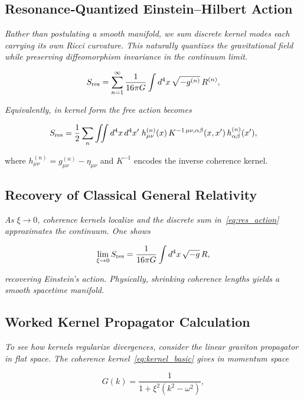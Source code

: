 \subsection{Resonance‐Quantized Einstein–Hilbert Action}

\textit{Rather than postulating a smooth manifold, we sum discrete kernel modes each carrying its own Ricci curvature.  This naturally quantizes the gravitational field while preserving diffeomorphism invariance in the continuum limit.}

\begin{equation}\label{eq:res_action}
S_{\rm res}
= \sum_{n=1}^\infty \frac{1}{16\pi G}
  \int d^4x\,\sqrt{-g^{(n)}}\,R^{(n)},
\end{equation}

\textit{Equivalently, in kernel form the free action becomes}

\begin{equation}\label{eq:kernel_eh}
S_{\rm res}
= \frac{1}{2}\sum_n \iint d^4x\,d^4x'\;
  h_{\mu\nu}^{(n)}(x)\,
  K^{-1\,\mu\nu,\alpha\beta}(x,x')\,
  h_{\alpha\beta}^{(n)}(x'),
\end{equation}

\noindent where $h_{\mu\nu}^{(n)}=g_{\mu\nu}^{(n)}-\eta_{\mu\nu}$ and $K^{-1}$ encodes the inverse coherence kernel.

\subsection{Recovery of Classical General Relativity}

\textit{As $\xi\to0$, coherence kernels localize and the discrete sum in~\eqref{eq:res_action} approximates the continuum.  One shows}

\[
\lim_{\xi\to0}S_{\rm res}
= \frac{1}{16\pi G}\int d^4x\,\sqrt{-g}\,R,
\]

\textit{recovering Einstein’s action.  Physically, shrinking coherence lengths yields a smooth spacetime manifold.}

\subsection{Worked Kernel Propagator Calculation}

\textit{To see how kernels regularize divergences, consider the linear graviton propagator in flat space.  The coherence kernel~\eqref{eq:kernel_basic} gives in momentum space}

\begin{equation}\label{eq:propagator}
G(k) = \frac{1}{1 + \xi^2(k^2 - \omega^2)},
\end{equation}


